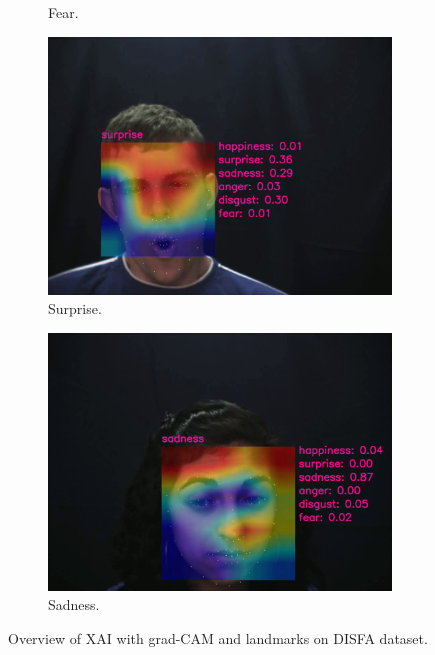 \begin{figure}[ht]
\begin{subfigure}{0.49\linewidth}
    \caption{Fear.}
    \label{fig:v2}
  \end{subfigure}
  \hfill
  \begin{subfigure}{0.49\linewidth}
    \includegraphics[width=\linewidth]{GiMeFive03.png}
    \caption{Surprise.}
    \label{fig:v3}
  \end{subfigure}
  \hfill
  \begin{subfigure}{0.49\linewidth}
    \includegraphics[width=\linewidth]{GiMeFive04.png}
    \caption{Sadness.}
    \label{fig:v4}
  \end{subfigure}
  \caption{Overview of XAI with grad-CAM and landmarks on DISFA dataset.}
  \label{fig:video}
\end{figure}

